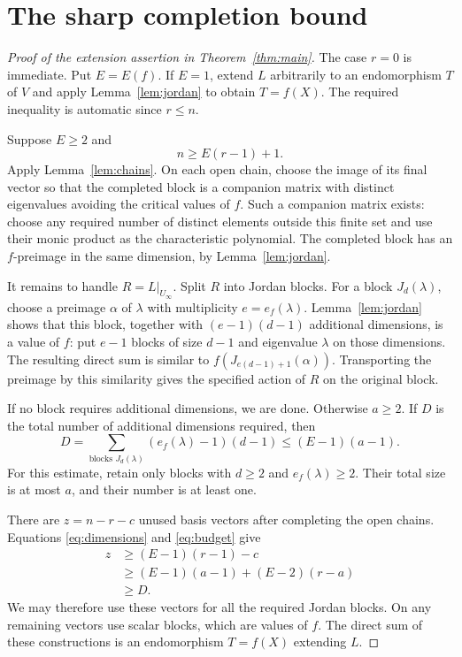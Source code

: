 \documentclass[11pt]{article}
\theoremstyle{remark}\newtheorem{remark}[theorem]{Remark}
\begin{document}
\section{The sharp completion bound}
\begin{proof}[Proof of the extension assertion in Theorem~\ref{thm:main}]
The case $r=0$ is immediate. Put $E=E(f)$. If $E=1$, extend $L$ arbitrarily to an endomorphism $T$ of $V$ and apply Lemma~\ref{lem:jordan} to obtain $T=f(X)$. The required inequality is automatic since $r\le n$.

Suppose $E\ge2$ and
\begin{equation}\label{eq:budget}
 n\ge E(r-1)+1.
\end{equation}
Apply Lemma~\ref{lem:chains}. On each open chain, choose the image of its final vector so that the completed block is a companion matrix with distinct eigenvalues avoiding the critical values of $f$. Such a companion matrix exists: choose any required number of distinct elements outside this finite set and use their monic product as the characteristic polynomial. The completed block has an $f$-preimage in the same dimension, by Lemma~\ref{lem:jordan}.

It remains to handle $R=L|_{U_\infty}$. Split $R$ into Jordan blocks. For a block $J_d(\lambda)$, choose a preimage $\alpha$ of $\lambda$ with multiplicity $e=e_f(\lambda)$. Lemma~\ref{lem:jordan} shows that this block, together with $(e-1)(d-1)$ additional dimensions, is a value of $f$: put $e-1$ blocks of size $d-1$ and eigenvalue $\lambda$ on those dimensions. The resulting direct sum is similar to $f(J_{e(d-1)+1}(\alpha))$. Transporting the preimage by this similarity gives the specified action of $R$ on the original block.

If no block requires additional dimensions, we are done. Otherwise $a\ge2$. If $D$ is the total number of additional dimensions required, then
\begin{equation}\label{eq:cost}
 D=\sum_{\text{blocks }J_d(\lambda)}
        (e_f(\lambda)-1)(d-1)\le(E-1)(a-1).
\end{equation}
For this estimate, retain only blocks with $d\ge2$ and $e_f(\lambda)\ge2$. Their total size is at most $a$, and their number is at least one.

There are $z=n-r-c$ unused basis vectors after completing the open chains. Equations \eqref{eq:dimensions} and \eqref{eq:budget} give
\begin{align*}
 z&\ge(E-1)(r-1)-c\\
  &\ge(E-1)(a-1)+(E-2)(r-a)\\
  &\ge D.
\end{align*}
We may therefore use these vectors for all the required Jordan blocks. On any remaining vectors use scalar blocks, which are values of $f$. The direct sum of these constructions is an endomorphism $T=f(X)$ extending $L$.


\end{proof}
\end{document}
